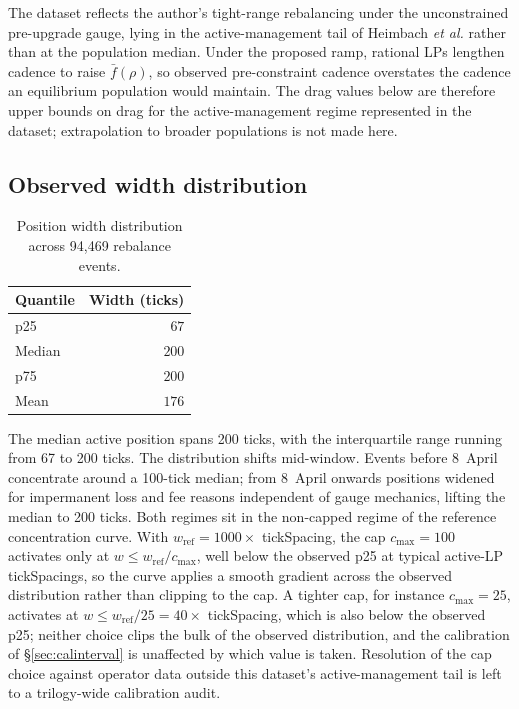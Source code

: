 \documentclass[11pt,a4paper]{article}
\theoremstyle{definition}
\theoremstyle{plain}
\theoremstyle{remark}
\begin{document}
The dataset reflects the author's tight-range rebalancing under the unconstrained pre-upgrade gauge, lying in the active-management tail of Heimbach \emph{et al.}\cite{heimbach2022} rather than at the population median. Under the proposed ramp, rational LPs lengthen cadence to raise $\bar f(\rho)$, so observed pre-constraint cadence overstates the cadence an equilibrium population would maintain. The drag values below are therefore upper bounds on drag for the active-management regime represented in the dataset; extrapolation to broader populations is not made here.

\subsection{Observed width distribution}\label{sec:calwidth}

\begin{table}[H]
\centering
\caption{Position width distribution across 94{,}469 rebalance events.}
\label{tab:width}
\begin{tabular}{@{}lr@{}}
\toprule
Quantile & Width (ticks) \\
\midrule
p25 & $67$ \\
Median & $200$ \\
p75 & $200$ \\
Mean & $176$ \\
\bottomrule
\end{tabular}
\end{table}

The median active position spans 200 ticks, with the interquartile range running from 67 to 200 ticks. The distribution shifts mid-window. Events before 8~April concentrate around a 100-tick median; from 8~April onwards positions widened for impermanent loss and fee reasons independent of gauge mechanics, lifting the median to 200 ticks. Both regimes sit in the non-capped regime of the reference concentration curve. With $w_{\text{ref}} = 1000 \times$ tickSpacing, the cap $c_{\max} = 100$ activates only at $w \leq w_{\text{ref}}/c_{\max}$, well below the observed p25 at typical active-LP tickSpacings, so the curve applies a smooth gradient across the observed distribution rather than clipping to the cap. A tighter cap, for instance $c_{\max} = 25$, activates at $w \leq w_{\text{ref}}/25 = 40 \times$ tickSpacing, which is also below the observed p25; neither choice clips the bulk of the observed distribution, and the calibration of \S\ref{sec:calinterval} is unaffected by which value is taken. Resolution of the cap choice against operator data outside this dataset's active-management tail is left to a trilogy-wide calibration audit.
\end{document}
